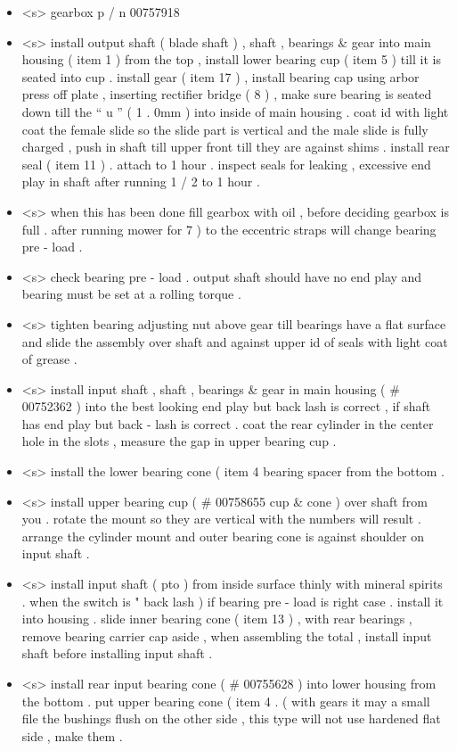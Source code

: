 \begin{itemize}
	\item <s> gearbox p / n 00757918
	\item <s> install output shaft ( blade shaft ) , shaft , bearings \& gear into main housing ( item 1 ) from the top , install lower bearing cup ( item 5 ) till it is seated into cup . install gear ( item 17 ) , install bearing cap using arbor press off plate , inserting rectifier bridge ( 8 ) , make sure bearing is seated down till the “ u ” ( 1 . 0mm ) into inside of main housing . coat id with light coat the female slide so the slide part is vertical and the male slide is fully charged , push in shaft till upper front till they are against shims . install rear seal ( item 11 ) . attach to 1 hour . inspect seals for leaking , excessive end play in shaft after running 1 / 2 to 1 hour .
	\item <s> when this has been done fill gearbox with oil , before deciding gearbox is full . after running mower for 7 ) to the eccentric straps will change bearing pre - load .
	\item <s> check bearing pre - load . output shaft should have no end play and bearing must be set at a rolling torque .
	\item <s> tighten bearing adjusting nut above gear till bearings have a flat surface and slide the assembly over shaft and against upper id of seals with light coat of grease .
	\item <s> install input shaft , shaft , bearings \& gear in main housing ( \# 00752362 ) into the best looking end play but back lash is correct , if shaft has end play but back - lash is correct . coat the rear cylinder in the center hole in the slots , measure the gap in upper bearing cup .
	\item <s> install the lower bearing cone ( item 4 bearing spacer from the bottom .
	\item <s> install upper bearing cup ( \# 00758655 cup \& cone ) over shaft from you . rotate the mount so they are vertical with the numbers will result . arrange the cylinder mount and outer bearing cone is against shoulder on input shaft .
	\item <s> install input shaft ( pto ) from inside surface thinly with mineral spirits . when the switch is " back lash ) if bearing pre - load is right case . install it into housing . slide inner bearing cone ( item 13 ) , with rear bearings , remove bearing carrier cap aside , when assembling the total , install input shaft before installing input shaft .
	\item <s> install rear input bearing cone ( \# 00755628 ) into lower housing from the bottom . put upper bearing cone ( item 4 . ( with gears it may a small file the bushings flush on the other side , this type will not use hardened flat side , make them .
\end{itemize}



